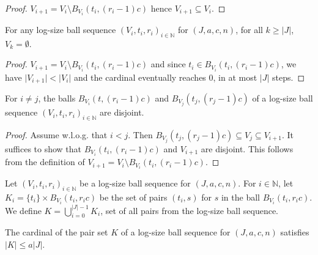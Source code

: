 \begin{proof}
\leanok
$V_{i+1} = V_i \setminus B_{V_i}(t_i, (r_i - 1)c)$ hence $V_{i+1} \subseteq V_i$.
\end{proof}


\begin{lemma}\label{lem:logSizeBallSequence_eq_zero}
  \mathlibok
For any log-size ball sequence $(V_i, t_i, r_i)_{i \in \mathbb{N}}$ for $(J, a, c, n)$, for all $k \ge \vert J \vert$, $V_k = \emptyset$.
\end{lemma}

\begin{proof}
  \leanok
$V_{i+1} = V_i \setminus B_{V_i}(t_i, (r_i - 1)c)$ and since $t_i \in B_{V_i}(t_i, (r_i - 1)c)$, we have $\vert V_{i+1} \vert < \vert V_i \vert$ and the cardinal eventually reaches $0$, in at most $\vert J \vert$ steps.
\end{proof}


\begin{lemma}\label{lem:logSizeBallSequence_disjoint_B}
  \mathlibok
For $i \ne j$, the balls $B_{V_i}(t, (r_i-1)c)$ and $B_{V_j}(t_j, (r_j-1)c)$ of a log-size ball sequence $(V_i, t_i, r_i)_{i \in \mathbb{N}}$ are disjoint.
\end{lemma}

\begin{proof}
  \leanok
Assume w.l.o.g. that $i < j$.
Then $B_{V_j}(t_j, (r_j-1)c) \subseteq V_j \subseteq V_{i+1}$.
It suffices to show that $B_{V_i}(t_i, (r_i-1)c)$ and $V_{i+1}$ are disjoint.
This follows from the definition of $V_{i+1} = V_i \setminus B_{V_i}(t_i, (r_i-1)c)$.
\end{proof}


\begin{definition}\label{def:pairSet}
  \mathlibok
Let $(V_i, t_i, r_i)_{i \in \mathbb{N}}$ be a log-size ball sequence for $(J, a, c, n)$.
For $i \in \mathbb{N}$, let $K_i = \{t_i\} \times B_{V_i}(t_i, r_i c)$ be the set of pairs $(t_i, s)$ for $s$ in the ball $B_{V_i}(t_i, r_i c)$.
We define $K = \bigcup_{i=0}^{\vert J \vert-1} K_i$, set of all pairs from the log-size ball sequence.
\end{definition}


\begin{lemma}\label{lem:card_pairSet_le}
  \mathlibok
The cardinal of the pair set $K$ of a log-size ball sequence for $(J, a, c, n)$ satisfies $|K| \le a |J|$.
\end{lemma}


